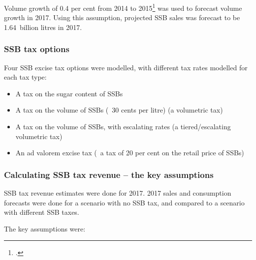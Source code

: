 \documentclass[embargoed]{grattan}
\begin{document}
Volume growth of 0.4 per cent from 2014 to 2015\footcite{Media2015RetailWorldAnnual} was used to forecast volume growth in 2017.
Using this assumption, projected SSB sales was forecast to be 1.64~billion litres in 2017.

\subsubsection{SSB tax options}\label{ssb-tax-options}

Four SSB excise tax options were modelled, with different tax rates modelled for each tax type:

\begin{itemize}
\item
  A tax on the sugar content of SSBs
\item
  A tax on the volume of SSBs (\eg~30 cents per litre) (a volumetric tax)
\item
  A tax on the volume of SSBs, with escalating rates (a tiered/escalating volumetric tax)
\item
  An ad valorem excise tax (\eg~a tax of 20 per cent on the retail price of SSBs)
\end{itemize}

\subsubsection{Calculating SSB tax revenue -- the key assumptions }\label{calculating-ssb-tax-revenue-the-key-assumptions}

SSB tax revenue estimates were done for 2017. 2017 sales and consumption forecasts were done for a scenario with no SSB tax, and compared to a scenario with different SSB taxes.

The key assumptions were:
\end{document}

